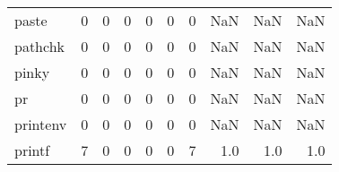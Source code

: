 \begin{longtable}{lrrrrrrrrr}
paste     &                                                  0 &                                                  0 &                                                  0 &                                                  0 &                                                  0 &                                                  0 &                                                NaN &                                    NaN &                                  NaN \\
pathchk   &                                                  0 &                                                  0 &                                                  0 &                                                  0 &                                                  0 &                                                  0 &                                                NaN &                                    NaN &                                  NaN \\
pinky     &                                                  0 &                                                  0 &                                                  0 &                                                  0 &                                                  0 &                                                  0 &                                                NaN &                                    NaN &                                  NaN \\
pr        &                                                  0 &                                                  0 &                                                  0 &                                                  0 &                                                  0 &                                                  0 &                                                NaN &                                    NaN &                                  NaN \\
printenv  &                                                  0 &                                                  0 &                                                  0 &                                                  0 &                                                  0 &                                                  0 &                                                NaN &                                    NaN &                                  NaN \\
printf    &                                                  7 &                                                  0 &                                                  0 &                                                  0 &                                                  0 &                                                  7 &                                                1.0 &                                    1.0 &                                  1.0 \\

\end{longtable}
